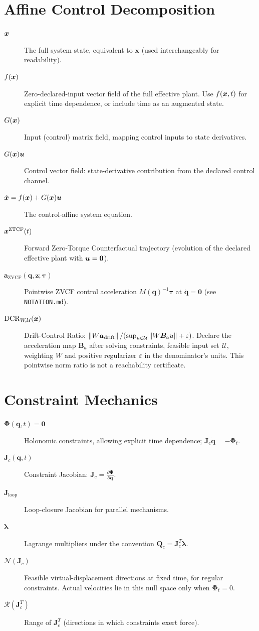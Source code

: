 \section*{Affine Control Decomposition}
\begin{description}
    \item[$\bm{x}$] The full system state, equivalent to $\bm{x}$ (used interchangeably for readability).
    \item[$f(\bm{x})$] Zero-declared-input vector field of the full effective plant. Use $f(\bm{x},t)$ for explicit time dependence, or include time as an augmented state.
    \item[$G(\bm{x})$] Input (control) matrix field, mapping control inputs to state derivatives.
    \item[$G(\bm{x})\bm{u}$] Control vector field: state-derivative contribution from the declared control channel.
    \item[$\dot{\bm{x}} = f(\bm{x}) + G(\bm{x})\bm{u}$] The control-affine system equation.
    \item[$\bm{x}^{\mathrm{ZTCF}}(t)$] Forward Zero-Torque Counterfactual trajectory (evolution of the declared effective plant with $\bm{u} = \bm{0}$).
    \item[$\bm{a}_{\mathrm{ZVCF}}(\bm{q},\bm{z};\bm{\tau})$] Pointwise ZVCF control acceleration $M(\bm{q})^{-1}\bm{\tau}$ at $\dot{\bm{q}}=\bm{0}$ (see \texttt{NOTATION.md}).
    \item[$\mathrm{DCR}_{W,\mathcal{U}}(\bm{x})$] Drift-Control Ratio: $\left\lVert W\bm{a}_{\mathrm{drift}} \right\rVert/(\sup_{u\in\mathcal{U}}\left\lVert W\bm{B}_a u \right\rVert+\varepsilon)$. Declare the acceleration map $\bm{B}_a$ after solving constraints, feasible input set $\mathcal{U}$, weighting $W$ and positive regularizer $\varepsilon$ in the denominator's units. This pointwise norm ratio is not a reachability certificate.
\end{description}

\section*{Constraint Mechanics}
\begin{description}
    \item[$\bm{\Phi}(\bm{q},t) = \bm{0}$] Holonomic constraints, allowing explicit time dependence; $\bm{J}_c\dot{\bm{q}}=-\bm{\Phi}_t$.
    \item[$\bm{J}_c(\bm{q},t)$] Constraint Jacobian: $\bm{J}_c = \frac{\partial \bm{\Phi}}{\partial \bm{q}}$.
    \item[$\bm{J}_{\mathrm{loop}}$] Loop-closure Jacobian for parallel mechanisms.
    \item[$\boldsymbol{\lambda}$] Lagrange multipliers under the convention $\bm{Q}_c=\bm{J}_c^T\boldsymbol{\lambda}$.
    \item[$\mathcal{N}(\bm{J}_c)$] Feasible virtual-displacement directions at fixed time, for regular constraints. Actual velocities lie in this null space only when $\bm{\Phi}_t=0$.
    \item[$\mathcal{R}(\bm{J}_c^T)$] Range of $\bm{J}_c^T$ (directions in which constraints exert force).
\end{description}

